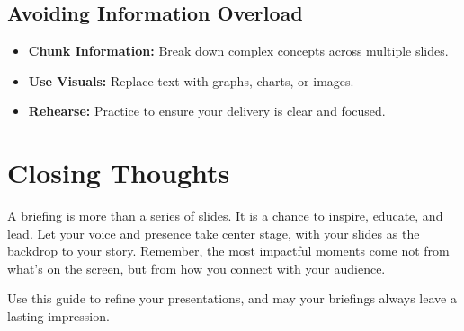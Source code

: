 \documentclass[12pt]{article}
\begin{document}
\subsection{Avoiding Information Overload}
\begin{itemize}
    \item \textbf{Chunk Information:} Break down complex concepts across multiple slides.
    \item \textbf{Use Visuals:} Replace text with graphs, charts, or images.
    \item \textbf{Rehearse:} Practice to ensure your delivery is clear and focused.
\end{itemize}

\section{Closing Thoughts}
A briefing is more than a series of slides. It is a chance to inspire, educate, and lead. Let your voice and presence take center stage, with your slides as the backdrop to your story. Remember, the most impactful moments come not from what's on the screen, but from how you connect with your audience.

\vspace{1em}
\noindent Use this guide to refine your presentations, and may your briefings always leave a lasting impression.
\end{document}
